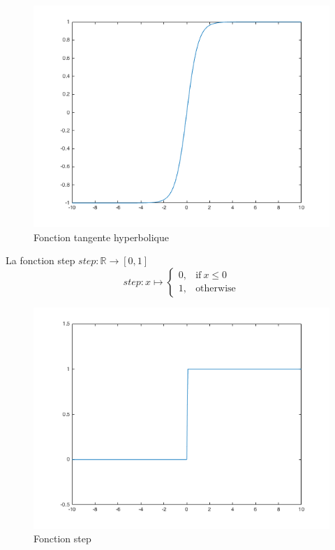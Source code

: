 \documentclass{article}
\begin{document}
\begin{figure}[h]
\begin{center}
	\includegraphics[scale=0.4]{tanh.png} 
	\caption{Fonction tangente hyperbolique}
\end{center}
\end{figure}

La fonction step $step : \mathbb{R} \rightarrow [0, 1]$
\begin{equation}
	step : x \mapsto
		\begin{cases}
			0, & \text{if}\ x \leq 0\\
			1, & \text{otherwise}
		\end{cases}
\end{equation}

\begin{figure}[h]
\begin{center}
	\includegraphics[scale=0.4]{step.png} 
	\caption{Fonction step}
\end{center}
\end{figure}
\end{document}
